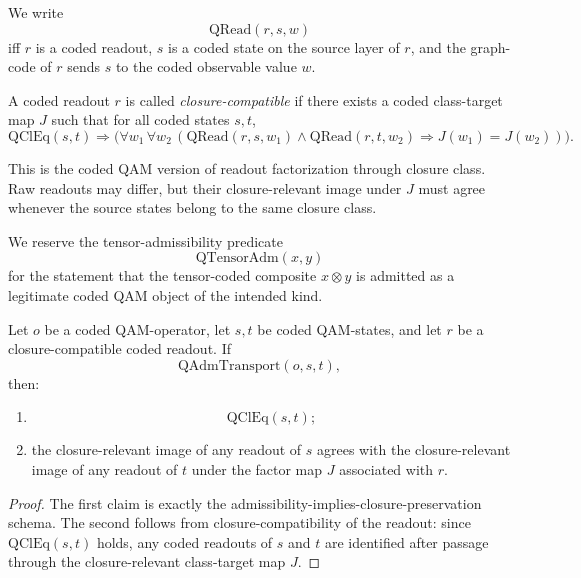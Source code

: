 \begin{definition}
We write
\[
\mathrm{QRead}(r,s,w)
\]
iff $r$ is a coded readout, $s$ is a coded state on the source layer of $r$, and the graph-code of $r$ sends $s$ to the coded observable value $w$.
\end{definition}

\begin{definition}\label{def:qam-closure-compatible-readout}
A coded readout $r$ is called \emph{closure-compatible} if there exists a coded class-target map $J$ such that for all coded states $s,t$,
\[
\mathrm{QClEq}(s,t)\Longrightarrow
\bigl(
\forall w_1\,\forall w_2\,
(\mathrm{QRead}(r,s,w_1)\wedge \mathrm{QRead}(r,t,w_2)\Longrightarrow J(w_1)=J(w_2))
\bigr).
\]
\end{definition}

\begin{remark}
This is the coded QAM version of readout factorization through closure class. Raw readouts may differ, but their closure-relevant image under $J$ must agree whenever the source states belong to the same closure class.
\end{remark}

\begin{definition}
We reserve the tensor-admissibility predicate
\[
\mathrm{QTensorAdm}(x,y)
\]
for the statement that the tensor-coded composite $x\otimes y$ is admitted as a legitimate coded QAM object of the intended kind.
\end{definition}

\begin{proposition}
Let $o$ be a coded QAM-operator, let $s,t$ be coded QAM-states, and let $r$ be a closure-compatible coded readout. If
\[
\mathrm{QAdmTransport}(o,s,t),
\]
then:
\begin{enumerate}
\item \[
\mathrm{QClEq}(s,t);
\]
\item the closure-relevant image of any readout of $s$ agrees with the closure-relevant image of any readout of $t$ under the factor map $J$ associated with $r$.
\end{enumerate}
\end{proposition}

\begin{proof}
The first claim is exactly the admissibility-implies-closure-preservation schema. The second follows from closure-compatibility of the readout: since $\mathrm{QClEq}(s,t)$ holds, any coded readouts of $s$ and $t$ are identified after passage through the closure-relevant class-target map $J$.
\end{proof}

